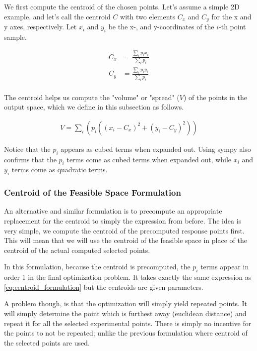 \documentclass{article}
\begin{document}
	We first compute the centroid of the chosen points. Let's assume a simple 2D example, and let's call the centroid $C$ with two elements $C_x$ and $C_y$ for the x and y axes, respectively. Let $x_i$ and $y_i$ be the x-, and y-coordinates of the $i$-th point sample.
	
	\begin{align}
		C_x &= \frac{\sum_i p_i x_i}{\sum_i p_i}  \\
		C_y &= \frac{\sum_i p_i y_i}{\sum_i p_i}  \\
	\end{align}
	
	The centroid helps us compute the "volume" or "spread" ($V$) of the points in the output space, which we define in this subsection as follows.
	
	\begin{align} \label{eq:centroid_formulation}
		V = \sum_i \left(p_i\left(\left(x_i - C_x\right)^2 + \left(y_i - C_y\right)^2\right)\right)
	\end{align}
	
	Notice that the $p_i$ appears as cubed terms when expanded out. Using sympy also confirms that the $p_i$ terms come as cubed terms when expanded out, while $x_i$ and $y_i$ terms come as quadratic terms.
	
	\subsubsection{Centroid of the Feasible Space Formulation}
	
	An alternative and similar formulation is to precompute an appropriate replacement for the centroid to simply the expression from before. The idea is very simple, we compute the centroid of the precomputed response points first. This will mean that we will use the centroid of the feasible space in place of the centroid of the actual computed selected points.
	
	In this formulation, because the centroid is precomputed, the $p_i$ terms appear in order 1 in the final optimization problem. It takes exactly the same expression as \eqref{eq:centroid_formulation} but the centroids are given parameters.
	
	A problem though, is that the optimization will simply yield repeated points. It will simply determine the point which is furthest away (euclidean distance) and repeat it for all the selected experimental points. There is simply no incentive for the points to not be repeated; unlike the previous formulation where centroid of the selected points are used.
	
\end{document}
